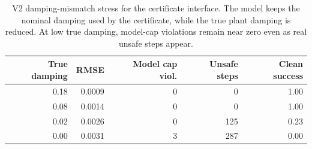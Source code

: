 \begin{table}[t]
\centering
\caption{V2 damping-mismatch stress for the certificate interface. The model keeps the nominal damping used by the certificate, while the true plant damping is reduced. At low true damping, model-cap violations remain near zero even as real unsafe steps appear.}
\label{tab:damping-mismatch}
\begin{tabular}{rrrrr}
\toprule
True damping & RMSE & Model cap viol. & Unsafe steps & Clean success \\
\midrule
0.18 & 0.0009 & 0 & 0 & 1.00 \\
0.08 & 0.0014 & 0 & 0 & 1.00 \\
0.02 & 0.0026 & 0 & 125 & 0.23 \\
0.00 & 0.0031 & 3 & 287 & 0.00 \\
\bottomrule
\end{tabular}
\end{table}
